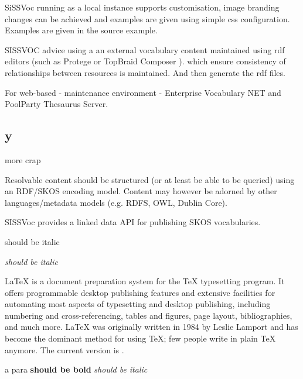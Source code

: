 \documentclass[10pt,a4paper]{article}
\begin{document}
\begin{flushleft}
  SiSSVoc running as a local instance supports customisation, image branding
changes can be achieved and examples are given using simple css configuration.
Examples are given in the source example.

  SISSVOC advice using a an external vocabulary content maintained using rdf
editors (such as Protege or TopBraid Composer ). which ensure consistency of
relationships between resources is maintained. And then generate the rdf files. 

  For web-based - maintenance environment - Enterprise Vocabulary NET and
PoolParty Thesaurus Server. 




\subsection{y}
  more crap


\begin{subsection}{Resolvable content should be structured (or at least be able to be queried)
  using an RDF/SKOS encoding model. Content may however be adorned by other
  languages/metadata models (e.g. RDFS, OWL, Dublin Core).  }

  SISSVoc provides a linked data API for publishing SKOS vocabularies.


  \begin{textit}{
    should be italic
  }
  \end{textit}


\end{subsection}





  \end{flushleft}


  \textit{should be italic}


\LaTeX{} is a document preparation system for the \TeX{}
  typesetting program. It offers programmable desktop
  publishing features and extensive facilities for
  automating most aspects of typesetting and desktop
  publishing, including numbering and cross-referencing,
  tables and figures, page layout, bibliographies, and
  much more. \LaTeX{} was originally written in 1984 by
  Leslie Lamport and has become the dominant method for
  using \TeX; few people write in plain \TeX{} anymore.
  The current version is \LaTeXe.

  \begin{flushright}
  a para
  \textbf{should be bold}
  \textit{should be italic}

  \end{flushright}
\end{document}
